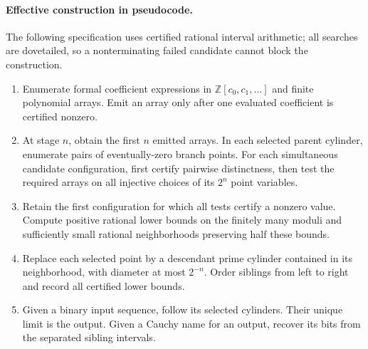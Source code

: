 \documentclass[11pt,a4paper]{article}
\theoremstyle{definition}
\theoremstyle{remark}
\numberwithin{equation}{section}
\begin{document}
\paragraph{Effective construction in pseudocode.}
The following specification uses certified rational interval arithmetic;
all searches are dovetailed, so a nonterminating failed candidate cannot
block the construction.
\begin{enumerate}
\item Enumerate formal coefficient expressions in
$\mathbb Z[c_0,c_1,\ldots]$ and finite polynomial arrays. Emit an array
only after one evaluated coefficient is certified nonzero.
\item At stage $n$, obtain the first $n$ emitted arrays. In each selected
parent cylinder, enumerate pairs of eventually-zero branch points.
For each simultaneous candidate configuration, first certify pairwise
distinctness, then test the required arrays on all injective choices
of its $2^n$ point variables.
\item Retain the first configuration for which all tests certify a
nonzero value. Compute positive rational lower bounds on the finitely
many moduli and sufficiently small rational neighborhoods preserving
half these bounds.
\item Replace each selected point by a descendant prime cylinder
contained in its neighborhood, with diameter at most $2^{-n}$. Order
siblings from left to right and record all certified lower bounds.
\item Given a binary input sequence, follow its selected cylinders.
Their unique limit is the output. Given a Cauchy name for an output,
recover its bits from the separated sibling intervals.
\end{enumerate}
\end{document}
